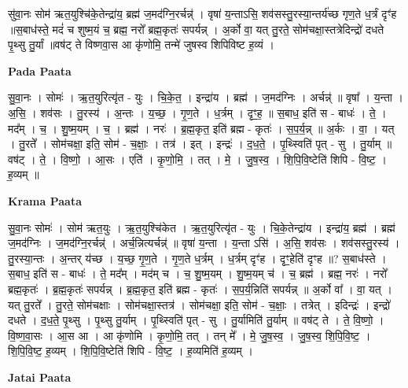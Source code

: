 \documentclass[17pt]{extarticle}
\begin{document}
सु॑वा॒नः सोम॑ ऋत॒युश्चि॑के॒तेन्द्रा॑य॒ ब्रह्म॑ ज॒मद॑ग्नि॒रर्चन्न्॑ । वृषा॑ य॒न्ताऽसि॒ शव॑सस्तु॒रस्या॒न्तर्य॑च्छ गृण॒ते ध॒र्त्रं दृꣳ॑ह ॥स॒बाध॑स्ते॒ मदं॑ च शुष्म॒यं च॒ ब्रह्म॒ नरो᳚ ब्रह्म॒कृतः॑ सपर्यन्न् । अ॒र्को वा॒ यत् तु॒रते॒ सोम॑चक्षा॒स्तत्रेदिन्द्रो॑ दधते पृ॒थ्सु तु॒र्यां ॥वष॑ट् ते विष्णवा॒स आ कृ॑णोमि॒ तन्मे॑ जुषस्व शिपिविष्ट ह॒व्यं । \newline

\textbf{Pada Paata} \newline

सु॒वा॒नः । सोमः॑ । ऋ॒त॒युरित्यृ॑त - युः । चि॒के॒त॒ । इन्द्रा॑य । ब्रह्म॑ । ज॒मद॑ग्निः । अर्चन्न्॑ ॥ वृषा᳚ । य॒न्ता । अ॒सि॒ । शव॑सः । तु॒रस्य॑ । अ॒न्तः । य॒च्छ॒ । गृ॒ण॒ते । ध॒र्त्रम् । दृꣳ॒॒ह॒ ॥ स॒बाध॒ इति॑ स - बाधः॑ । ते॒ । मद᳚म् । च॒ । शु॒ष्म॒यम् । च॒ । ब्रह्म॑ । नरः॑ । ब्र॒ह्म॒कृत॒ इति॑ ब्रह्म - कृतः॑ । स॒प॒र्य॒न्न् ॥ अ॒र्कः । वा॒ । यत् । तु॒रते᳚ । सोम॑चक्षा॒ इति॒ सोम॑ - च॒क्षाः॒ । तत्र॑ । इत् । इन्द्रः॑ । द॒ध॒ते॒ । पृ॒थ्स्विति॑ पृत् - सु । तु॒र्याम् ॥ वष॑ट् । ते॒ । वि॒ष्णो॒ । आ॒सः । एति॑ । कृ॒णो॒मि॒ । तत् । मे॒ । जु॒ष॒स्व॒ । शि॒पि॒वि॒ष्टेति॑ शिपि - वि॒ष्ट॒ । ह॒व्यम् ॥  \newline


\textbf{Krama Paata} \newline

सु॒वा॒नः सोमः॑ । सोम॑ ऋत॒युः । ऋ॒त॒युश्चि॑केत । ऋ॒त॒युरित्यृ॑त - युः । चि॒के॒तेन्द्रा॑य । इन्द्रा॑य॒ ब्रह्म॑ । ब्रह्म॑ ज॒मद॑ग्निः । ज॒मद॑ग्नि॒रर्चन्न्॑ । अर्च॒न्नित्यर्चन्न्॑ ॥ वृषा॑ य॒न्ता । य॒न्ता ऽसि॑ । अ॒सि॒ शव॑सः । शव॑सस्तु॒रस्य॑ । तु॒रस्या॒न्तः । अ॒न्तर् य॑च्छ । य॒च्छ॒ गृ॒ण॒ते । गृ॒ण॒ते ध॒र्त्रम् । ध॒र्त्रम् दृꣳ॑ह । दृꣳ॒॒हेति॑ दृꣳह ॥? स॒बाध॑स्ते । स॒बाध॒ इति॑ स - बाधः॑ । ते॒ मद᳚म् । मद॑म् च । च॒ शु॒ष्म॒यम् । शु॒ष्म॒यम् च॑ । च॒ ब्रह्म॑ । ब्रह्म॒ नरः॑ । नरो᳚ ब्रह्म॒कृतः॑ । ब्र॒ह्म॒कृतः॑ सपर्यन्न् । ब्र॒ह्म॒कृत॒ इति॑ ब्रह्म - कृतः॑ । स॒प॒र्य॒न्निति॑ सपर्यन्न् ॥ अ॒र्को वा᳚ । वा॒ यत् । यत् तु॒रते᳚ । तु॒रते॒ सोम॑चक्षाः । सोम॑चक्षा॒स्तत्र॑ । सोम॑चक्षा॒ इति॒ सोम॑ - च॒क्षाः॒ । तत्रेत् । इदिन्द्रः॑ । इन्द्रो॑ दधते । द॒ध॒ते॒ पृ॒थ्सु । पृ॒थ्सु तु॒र्याम् । पृ॒थ्स्विति॑ पृत् - सु । तु॒र्यामिति॑ तु॒र्याम् ॥ वष॑ट् ते । ते॒ वि॒ष्णो॒ । वि॒ष्ण॒वा॒सः । आ॒स आ । आ कृ॑णोमि । कृ॒णो॒मि॒ तत् । तन् मे᳚ । मे॒ जु॒ष॒स्व॒ । जु॒ष॒स्व॒ शि॒पि॒वि॒ष्ट॒ । शि॒पि॒वि॒ष्ट॒ ह॒व्यम् । शि॒पि॒वि॒ष्टेति॑ शिपि - वि॒ष्ट॒ । ह॒व्यमिति॑ ह॒व्यम् । \newline

\textbf{Jatai Paata} \newline
\end{document}
